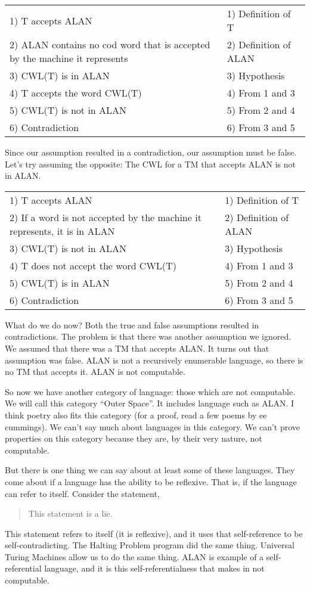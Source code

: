 \documentclass[letterpaper,12pt,openany,reqno]{book}%
\begin{document}
\begin{center}
\begin{tabular}{p{} l}
1) T accepts ALAN & 1) Definition of T\\
2) ALAN contains no cod word that is accepted by the machine it represents & 2) Definition of ALAN\\
3) CWL(T) is in ALAN & 3) Hypothesis\\
4) T accepts the word CWL(T) & 4) From 1 and 3\\
5) CWL(T) is not in ALAN & 5) From 2 and 4\\
6) Contradiction & 6) From 3 and 5
\end{tabular}
\end{center}

Since our assumption resulted in a contradiction, our assumption must be false. Let's try assuming the opposite: The CWL for a TM that accepts ALAN is not in ALAN.
\begin{center}
\begin{tabular}{p{} l}
1) T accepts ALAN & 1) Definition of T\\
2) If a word is not accepted by the machine it represents, it is in ALAN & 2) Definition of ALAN\\
3) CWL(T) is not in ALAN & 3) Hypothesis\\
4) T does not accept the word CWL(T) & 4) From 1 and 3\\
5) CWL(T) is in ALAN & 5) From 2 and 4\\
6) Contradiction & 6) From 3 and 5
\end{tabular}
\end{center}

What do we do now? Both the true and false assumptions resulted in contradictions. The problem is that there was another assumption we ignored. We assumed that there was a TM that accepts ALAN. It turns out that assumption was false. ALAN is not a recursively enumerable language, so there is no TM that accepts it. ALAN is not computable.

So now we have another category of language: those which are not computable. We will call this category ``Outer Space''. It includes language such as ALAN. I think poetry also fits this category (for a proof, read a few poems by ee cummings). We can't say much about languages in this category. We can't prove properties on this category because they are, by their very nature, not computable.

But there is one thing we can say about at least some of these languages. They come about if a language has the ability to be reflexive. That is, if the language can refer to itself. Consider the statement, 
\begin{quote}
This statement is a lie.
\end{quote}
This statement refers to itself (it is reflexive), and it uses that self-reference to be self-contradicting. The Halting Problem program did the same thing. Universal Turing Machines allow us to do the same thing. ALAN is example of a self-referential language, and it is this self-referentialness that makes in not computable.
\end{document}
